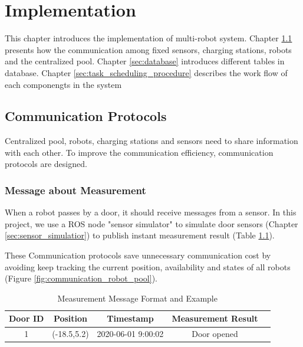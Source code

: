 \chapter{Implementation}
This chapter introduces the implementation of multi-robot system. Chapter \ref{sec:communication_protocols} presents how the communication among fixed sensors, charging stations, robots and the centralized pool. Chapter \ref{sec:database} introduces different tables in database. Chapter \ref{sec:task_scheduling_procedure} describes the work flow of each componengts in the system

\section{Communication Protocols}
\label{sec:communication_protocols}

Centralized pool, robots, charging stations and sensors need to share information with each other.
To improve the communication efficiency, communication protocols are designed. 

\subsection{Message about Measurement}
\label{sec:measurement_message}
When a robot passes by a door, it should receive messages from a sensor. In this project, we use a ROS node "sensor simulator" to simulate door sensors (Chapter \ref{sec:sensor_simulatior}) to publish instant measurement result (Table \ref{tab:sensor_message}).

These Communication protocols save unnecessary communication cost by avoiding keep tracking the current position, availability and states of all robots (Figure \ref{fig:communication_robot_pool}).

\begin{table}[htb]
\centering
\begin{tabular}{|c|c|c|c|c|} 
\hline
Door ID  & Position& Timestamp & Measurement Result \\
\hline\hline
1&(-18.5,5.2) & 2020-06-01 9:00:02 & Door opened \\ [1ex] 
\hline
\end{tabular}
\caption{Measurement Message Format and Example}
\label{tab:sensor_message}
\end{table}
	

